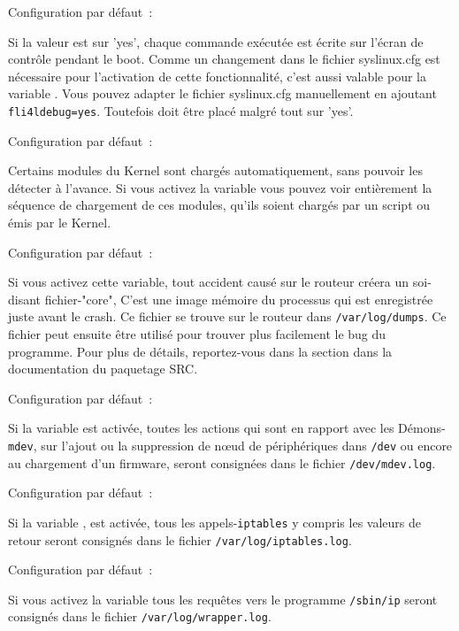 \begin{description}

  Configuration par défaut~: 

   Si la valeur est sur 'yes', chaque commande exécutée est écrite sur l'écran
   de contrôle pendant le boot. Comme un changement dans le fichier syslinux.cfg
   est nécessaire pour l'activation de cette fonctionnalité, c'est aussi valable
   pour la variable . Vous pouvez adapter le fichier
   syslinux.cfg manuellement en ajoutant \verb+fli4ldebug=yes+. Toutefois 
    doit être placé malgré tout sur 'yes'.


  Configuration par défaut~: 

   Certains modules du Kernel sont chargés automatiquement, sans pouvoir
   les détecter à l'avance. Si vous activez la variable 
   vous pouvez voir entièrement la séquence de chargement de ces modules,
   qu'ils soient chargés par un script ou émis par le Kernel.


  Configuration par défaut~: 

  Si vous activez cette variable, tout accident causé sur le routeur créera un
  soi-disant fichier-"core", C'est une image mémoire du processus qui est
  enregistrée juste avant le crash. Ce fichier se trouve sur le routeur dans
  \texttt{/var/log/dumps}. Ce fichier peut ensuite être utilisé pour trouver
  plus facilement le bug du programme. Pour plus de détails, reportez-vous dans
  la section  dans la
  documentation du paquetage SRC.


  Configuration par défaut~: 

  Si la variable  est activée, toutes les actions qui
  sont en rapport avec les Démons-\texttt{mdev}, sur l'ajout ou la suppression
  de n\oe{}ud de périphériques dans \texttt{/dev} ou encore au chargement d’un
  firmware, seront consignées dans le fichier \texttt{/dev/mdev.log}.


  Configuration par défaut~: 

  Si la variable , est activée, tous les
  appels-\texttt{iptables} y compris les valeurs de retour seront consignés
  dans le fichier \texttt{/var/log/iptables.log}.


    Configuration par défaut~: 

    Si vous activez la variable  tous les requêtes vers
    le programme \texttt{/sbin/ip} seront consignés dans le fichier
    \texttt{/var/log/wrapper.log}.
\end{description}
